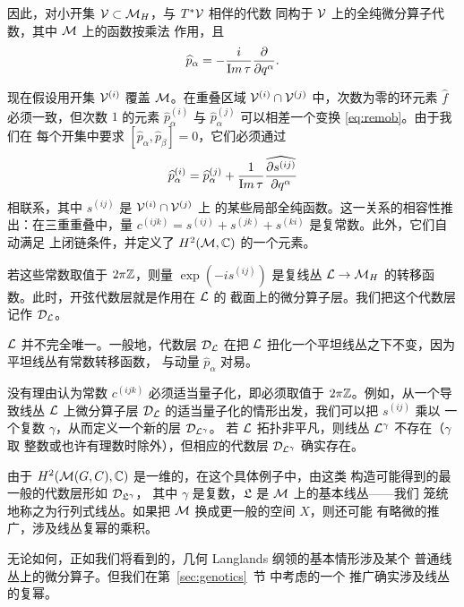因此，对小开集 ${\cal V}\subset \MH$，与 $T^*{{\cal V}}$ 相伴的代数
同构于 ${{\cal V}}$ 上的全纯微分算子代数，其中 $\M$ 上的函数按乘法
作用，且 %
\setcounter{equation}{14}
\begin{equation}\label{eq:mebolo}
\hat p_\alpha=-{i\over {\rm
Im}\,\tau}{\partial\over\partial q^\alpha}.
\end{equation}

现在假设用开集 ${{\cal V}}^{(i)}$ 覆盖 $\M$。在重叠区域
${{\cal V}}^{(i)}\cap {{\cal V}}^{(j)}$ 中，次数为零的环元素 $\hat f$
必须一致，但次数 $1$ 的元素 $\hat p_\alpha^{(i)}$ 与
$\hat p_\alpha^{(j)}$ 可以相差一个变换 \eqref{eq:remob}。由于我们在
每个开集中要求 $[\hat p_\alpha,\hat p_\beta]=0$，它们必须通过
\setcounter{equation}{15}
\begin{equation}\label{eq:hecox}
\hat p_\alpha^{(i)}=\hat
p_\alpha^{(j)}+{1\over {\rm Im}\,\tau}\hat{\partial s^{(ij)}\over
\partial q^\alpha}
\end{equation}
 相联系，其中 $s^{(ij)}$ 是 ${{\cal V}}^{(i)}\cap {{\cal V}}^{(j)}$ 上
的某些局部全纯函数。这一关系的相容性推出：在三重重叠中，量
$c^{(ijk)}=s^{(ij)}+s^{(jk)}+s^{(ki)}$ 是复常数。此外，它们自动满足
上闭链条件，并定义了 $H^2({\EUM},\Bbb{C})$ 的一个元素。

若这些常数取值于 $2\pi\Bbb{Z}$，则量 $\exp(-is^{(ij)})$ 是复线丛
${\cal L}\to \MH$ 的转移函数。此时，开弦代数层就是作用在 ${\cal L}$ 的
截面上的微分算子层。我们把这个代数层记作 ${\cal D}_{\cal L}$。

${\cal L}$ 并不完全唯一。一般地，代数层 ${\cal D}_{\cal L}$ 在把
${\cal L}$ 扭化一个平坦线丛之下不变，因为平坦线丛有常数转移函数，
与动量 $\hat p_\alpha$ 对易。

没有理由认为常数 $c^{(ijk)}$ 必须适当量子化，即必须取值于
$2\pi\Bbb{Z}$。例如，从一个导致线丛 ${\cal L}$ 上微分算子层
${\cal D}_{\cal L}$ 的适当量子化的情形出发，我们可以把 $s^{(ij)}$ 乘以
一个复数 $\gamma$，从而定义一个新的层 ${\cal D}_{{\cal L}^\gamma}$。
若 ${\cal L}$ 拓扑非平凡，则线丛 ${\cal L}^\gamma$ 不存在（$\gamma$ 取
整数或也许有理数时除外），但相应的代数层
${\cal D}_{{\cal L}^\gamma}$ 确实存在。

由于 $H^2({\EUM}(G,C),\Bbb{C})$ 是一维的，在这个具体例子中，由这类
构造可能得到的最一般的代数层形如 ${\cal D}_{{{\frak L}}^\gamma}$，
其中 $\gamma$ 是复数，${{\frak L}}$ 是 $\EUM$ 上的基本线丛——我们
笼统地称之为行列式线丛。如果把 $\EUM$ 换成更一般的空间 $X$，则还可能
有略微的推广，涉及线丛复幂的乘积。

无论如何，正如我们将看到的，几何 Langlands 纲领的基本情形涉及某个
普通线丛上的微分算子。但我们在第~\ref{sec:genotics}~节 中考虑的一个
推广确实涉及线丛的复幂。

